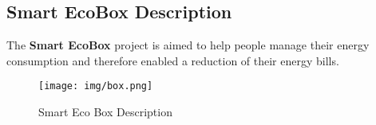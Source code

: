 
\subsection{Smart EcoBox Description}
% 
%


The \textbf{Smart EcoBox} project is aimed to help people manage their energy consumption and therefore enabled a reduction of their energy bills. 


\begin{figure}[H]
\centering
\texttt{[image: img/box.png]}
\caption{Smart Eco Box Description}
\label{fig:boxDescription}
\end{figure}



